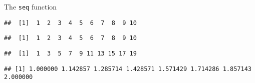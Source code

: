 \begin{frame}[fragile]{The \texttt{seq} function}
\protect\hypertarget{the-seq-function}{}

\begin{Shaded}
\begin{Highlighting}[]
\NormalTok{(}\NormalTok{,}\NormalTok{)}
\end{Highlighting}
\end{Shaded}

\begin{verbatim}
##  [1]  1  2  3  4  5  6  7  8  9 10
\end{verbatim}

\begin{Shaded}
\begin{Highlighting}[]
\OperatorTok{:}
\end{Highlighting}
\end{Shaded}

\begin{verbatim}
##  [1]  1  2  3  4  5  6  7  8  9 10
\end{verbatim}

\begin{Shaded}
\begin{Highlighting}[]
\NormalTok{(}\NormalTok{, }\NormalTok{, } \NormalTok{)}
\end{Highlighting}
\end{Shaded}

\begin{verbatim}
##  [1]  1  3  5  7  9 11 13 15 17 19
\end{verbatim}

\begin{Shaded}
\begin{Highlighting}[]
\NormalTok{(}\NormalTok{, }\NormalTok{, } \NormalTok{)}
\end{Highlighting}
\end{Shaded}

\begin{verbatim}
## [1] 1.000000 1.142857 1.285714 1.428571 1.571429 1.714286 1.857143 2.000000
\end{verbatim}

\end{frame}

